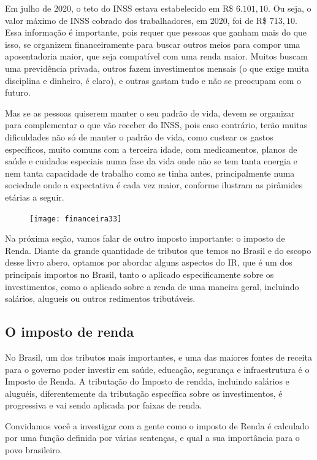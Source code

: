 Em julho de 2020, o teto do INSS estava estabelecido em R\$ $6.101{,}10$. Ou seja, o valor máximo de INSS cobrado dos trabalhadores, em 2020, foi de R\$ $713{,}10$. Essa informação é importante, pois requer que pessoas que ganham mais do que isso, se organizem financeiramente para buscar outros meios para compor uma aposentadoria maior, que seja compatível com uma renda maior. Muitos buscam uma previdência privada, outros fazem investimentos mensais (o que exige muita disciplina e dinheiro, é claro), e outras gastam tudo e não se preocupam com o futuro.

Mas se as pessoas quiserem manter o seu padrão de vida, devem se organizar para complementar o que vão receber do INSS, pois caso contrário, terão muitas dificuldades não só de manter o padrão de vida, como custear os gastos específicos, muito comuns com a terceira idade, com medicamentos, planos de saúde e cuidados especiais numa fase da vida onde não se tem tanta energia e nem tanta capacidade de trabalho como se tinha antes, principalmente numa sociedade onde a expectativa é cada vez maior, conforme ilustram as pirâmides etárias a seguir.

\begin{figure}[H]
\centering

\texttt{[image: financeira33]}
\end{figure}

Na próxima seção, vamos falar de outro imposto importante: o imposto de Renda. Diante da grande quantidade de tributos que temos no Brasil e do escopo desse livro abero, optamos por abordar alguns aspectos do IR, que é um dos principais impostos no Brasil, tanto o aplicado especificamente sobre os investimentos, como o aplicado sobre a renda de uma maneira geral, incluindo salários, alugueis ou outros redimentos tributáveis.

\subsection*{O imposto de renda}

No Brasil, um dos tributos mais importantes, e uma das  maiores fontes de receita para o governo poder investir em saúde, educação, segurança e infraestrutura é o Imposto de Renda. A tributação do Imposto de rendda, incluindo salários e aluguéis, diferentemente da tributação específica sobre os investimentos, é progressiva e vai sendo aplicada por faixas de renda.

Convidamos você a investigar com a gente como o imposto de Renda é calculado por uma função definida por várias sentenças, e qual a sua importância para o povo brasileiro.

